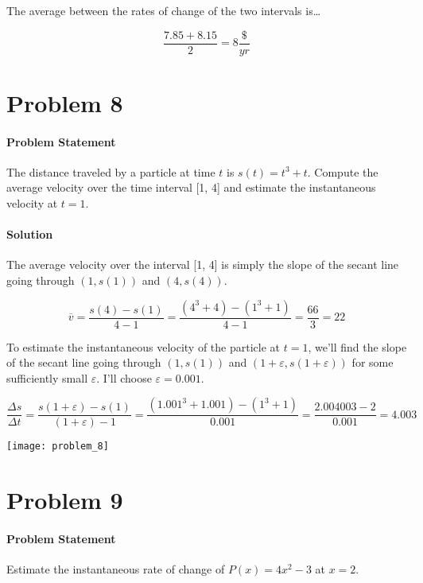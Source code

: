 \documentclass{article}
\begin{document}
\begin{enumerate}[(a)]
    The average between the rates of change of the two intervals is\dots

    \begin{equation}
      \frac{7.85 + 8.15}{2} = \boxed{8 \frac{\$}{yr}}
    \end{equation}
  \end{enumerate}
  \newpage

  \section{Problem 8}
  \paragraph{Problem Statement} The distance traveled by a particle at time \(t\) is \(s(t) = t^3 + t\). Compute the average velocity over the time interval [1, 4] and estimate the instantaneous velocity at \(t=1\).

  \paragraph{Solution} The average velocity over the interval [1, 4] is simply the slope of the secant line going through \((1, s(1)) \) and \( (4, s(4)) \).

  \begin{equation}
    \overline{v} = \frac{s(4) - s(1)}{4-1} = \frac{(4^3 + 4) - (1^3 + 1)}{4-1} = \frac{66}{3} = \boxed{22}
  \end{equation}

  To estimate the instantaneous velocity of the particle at \(t=1\), we'll find the slope of the secant line going through \((1, s(1)) \) and \( (1 + \varepsilon, s(1 + \varepsilon)) \) for some sufficiently small \(\varepsilon\). I'll choose \(\varepsilon = 0.001\).

  \begin{equation}
    \frac{\Delta{s}}{\Delta{t}} = \frac{s(1+\varepsilon)-s(1)}{(1+\varepsilon) - 1} = \frac{(1.001^3 + 1.001) - (1^3 + 1)}{0.001} = \frac{2.004003 - 2}{0.001} = \boxed{4.003}
  \end{equation}

  \texttt{[image: problem\_8]}
  \newpage

  \section{Problem 9}
  \paragraph{Problem Statement} Estimate the instantaneous rate of change of \(P(x) = 4x^2 - 3\) at \(x=2\).
\end{document}
